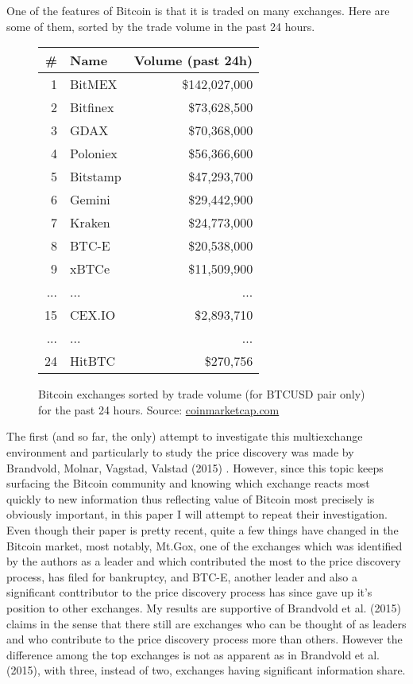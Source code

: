 \documentclass[a4paper,12pt]{article}
\begin{document}
    One of the features of Bitcoin is that it is traded on many exchanges. Here are some of them, sorted by the trade volume in the past 24 hours.

    \begin{figure}[h]
      \centering
      \begin{tabular}{|r|l|r|}
        \hline
        \textbf{\#} & \textbf{Name} & \textbf{Volume (past 24h)} \\
        \hline
        \hline
        1 & BitMEX & \$142,027,000 \\
        2 & Bitfinex & \$73,628,500 \\
        3 & GDAX & \$70,368,000 \\
        4 & Poloniex & \$56,366,600  \\
        5 & Bitstamp & \$47,293,700 \\
        6 & Gemini & \$29,442,900 \\
        7 & Kraken & \$24,773,000 \\
        8 & BTC-E & \$20,538,000 \\
        9 & xBTCe & \$11,509,900  \\
        ... & ... & ... \\
        15 & CEX.IO & \$2,893,710 \\
        ... & ... & ... \\
        24 & HitBTC & \$270,756 \\
        \hline
      \end{tabular}
      \caption{Bitcoin exchanges sorted by trade volume (for BTCUSD pair only) for the past 24 hours. Source: \href{https://coinmarketcap.com/currencies/bitcoin/\#markets}{coinmarketcap.com}}
    \end{figure}

    The first (and so far, the only) attempt to investigate this multiexchange environment and particularly to study the price discovery was made by Brandvold, Molnar, Vagstad, Valstad (2015) \cite{molnar}. However, since this topic keeps surfacing the Bitcoin community and knowing which exchange reacts most quickly to new information thus reflecting value of Bitcoin most precisely is obviously important, in this paper I will attempt to repeat their investigation. Even though their paper is pretty recent, quite a few things have changed in the Bitcoin market, most notably, Mt.Gox, one of the exchanges which was identified by the authors as a leader and which contributed the most to the price discovery process, has filed for bankruptcy, and BTC-E, another leader and also a significant conttributor to the price discovery process has since gave up it's position to other exchanges. My results are supportive of Brandvold et al. (2015) claims in the sense that there still are exchanges who can be thought of as leaders and who contribute to the price discovery process more than others. However the difference among the top exchanges is not as apparent as in Brandvold et al. (2015), with three, instead of two, exchanges having significant information share.
\end{document}
